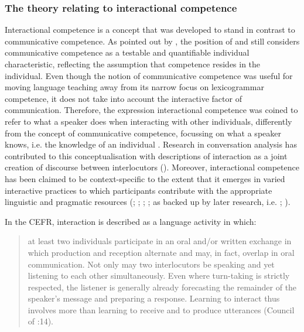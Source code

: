 \subsubsection{The theory relating to interactional competence}
\hypertarget{Toc191305875}{}
Interactional competence is a concept that was developed to stand in contrast to communicative competence. As pointed out by \citet{Young2014}, the position of \citet{Hymes1972} and \citet{CanaleSwain1980} still considers communicative competence as a testable and quantifiable individual characteristic, reflecting the assumption that competence resides in the individual. Even though the notion of communicative competence was useful for moving language teaching away from its narrow focus on lexicogrammar competence, it does not take into account the interactive factor of communication. Therefore, the expression interactional competence was coined to refer to what a speaker does when interacting with other individuals, differently from the concept of communicative competence, focussing on what a speaker knows, i.e. the knowledge of an individual \citep{Young2011}. Research in conversation analysis has contributed to this conceptualisation with descriptions of interaction as a joint creation of discourse between interlocutors (\citealt{JacobyOchs1995}). Moreover, interactional competence has been claimed to be context-specific to the extent that it emerges in varied interactive practices to which participants contribute with the appropriate linguistic and pragmatic resources (\citealt{Hall1993}; \citealt{HeYoung1998}; \citealt{Hall1995}; \citealt{Young2011}; as backed up by later research, i.e. \citealt{Tavakoli2016}; \citealt{Witton-Davies2014}).

In the CEFR, interaction is described as a language activity in which: 

\begin{quote}
at least two individuals participate in an oral and/or written exchange in which production and reception alternate and may, in fact, overlap in oral communication. Not only may two interlocutors be speaking and yet listening to each other simultaneously. Even where turn-taking is strictly respected, the listener is generally already forecasting the remainder of the speaker’s message and preparing a response. Learning to interact thus involves more than learning to receive and to produce utterances (Council of \citealt{Europe2001}:14).
\end{quote}

